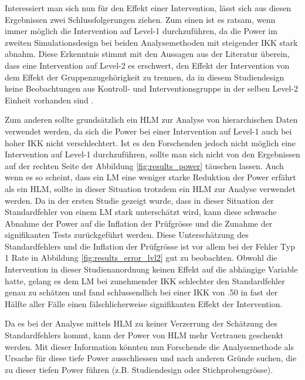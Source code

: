 \documentclass[12pt]{article}\usepackage[]{graphicx}\usepackage[]{color}
\begin{document}
Interessiert man sich nun für den Effekt einer Intervention, lässt sich aus diesen Ergebnissen zwei Schlussfolgerungen ziehen. Zum einen ist es ratsam, wenn immer möglich die Intervention auf Level-1 durchzuführen, da die Power im zweiten Simulationsdesign bei beiden Analysemethoden mit steigender IKK stark abnahm. Diese Erkenntnis stimmt mit den Aussagen aus der Literatur überein, dass eine Intervention auf Level-2 es erschwert, den Effekt der Intervention von dem Effekt der Gruppenzugehörigkeit zu trennen, da in diesem Studiendesign keine Beobachtungen aus Kontroll- und Interventionsgruppe in der selben Level-2 Einheit vorhanden sind \citep{cleary2012studydesign, moerbeek2000design}. 

Zum anderen sollte grundsätzlich ein HLM zur Analyse von hierarchischen Daten verwendet werden, da sich die Power bei einer Intervention auf Level-1 auch bei hoher IKK nicht verschlechtert. Ist es den Forschenden jedoch nicht möglich eine Intervention auf Level-1 durchzuführen, sollte man sich nicht von den Ergebnissen auf der rechten Seite der Abbildung \ref{fig:results_power} täuschen lassen. Auch wenn es so scheint, dass ein LM eine weniger starke Reduktion der Power erfährt als ein HLM, sollte in dieser Situation trotzdem ein HLM zur Analyse verwendet werden. Da in der ersten Studie gezeigt wurde, dass in dieser Situation der Standardfehler von einem LM stark unterschätzt wird, kann diese schwache Abnahme der Power auf die Inflation der Prüfgrösse und die Zunahme der signifikanten Tests zurückgeführt werden. Diese Unterschätzung des Standardfehlers und die Inflation der Prüfgrösse ist vor allem bei der Fehler Typ 1 Rate in Abbildung \ref{fig:results_error_lvl2} gut zu beobachten. Obwohl die Intervention in dieser Studienanordnung keinen Effekt auf die abhängige Variable hatte, gelang es dem LM bei zunehmender IKK schlechter den Standardfehler genau zu schätzen und fand schlussendlich bei einer IKK von .50 in fast der Hälfte aller Fälle einen fälschlicherweise signifikanten Effekt der Intervention.

Da es bei der Analyse mittels HLM zu keiner Verzerrung der Schätzung des Standardfehlers kommt, kann der Power von HLM mehr Vertrauen geschenkt werden. Mit dieser Information könnten nun Forschende die Analysemethode als Ursache für diese tiefe Power ausschliessen und nach anderen Gründe suchen, die zu dieser tiefen Power führen (z.B. Studiendesign oder Stichprobengrösse).
\end{document}
